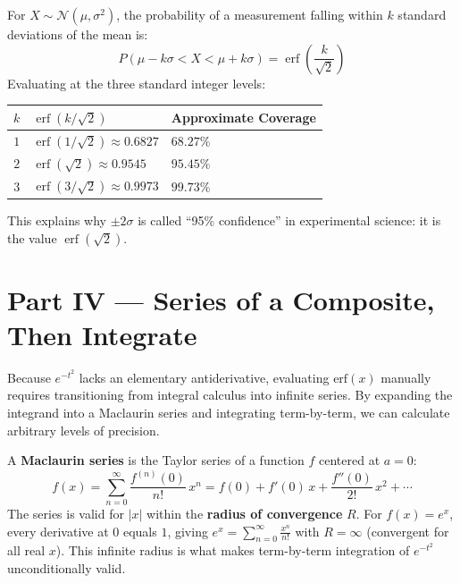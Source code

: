 \documentclass[11pt]{article}
\begin{document}
\begin{theorembox}
For $X \sim \mathcal{N}(\mu, \sigma^2)$, the probability of a measurement falling within $k$ standard deviations of the mean is:
\[ P(\mu - k\sigma < X < \mu + k\sigma) = \operatorname{erf}\!\left(\frac{k}{\sqrt{2}}\right) \]
Evaluating at the three standard integer levels:
\begin{center}
\begin{tabular}{c l l}
\toprule
$k$ & $\operatorname{erf}(k/\sqrt{2})$ & Approximate Coverage \\
\midrule
$1$ & $\operatorname{erf}(1/\sqrt{2}) \approx 0.6827$ & $68.27\%$ \\
$2$ & $\operatorname{erf}(\sqrt{2}) \approx 0.9545$ & $95.45\%$ \\
$3$ & $\operatorname{erf}(3/\sqrt{2}) \approx 0.9973$ & $99.73\%$ \\
\bottomrule
\end{tabular}
\end{center}
This explains why $\pm 2\sigma$ is called ``95\% confidence'' in experimental science: it is the value $\operatorname{erf}(\sqrt{2})$.
\end{theorembox}

\clearpage
{}
{}
\section*{Part IV --- Series of a Composite, Then Integrate}
\setcounter{section}{4}

Because $e^{-t^2}$ lacks an elementary antiderivative, evaluating $\text{erf}(x)$ manually requires transitioning from integral calculus into infinite series. By expanding the integrand into a Maclaurin series and integrating term-by-term, we can calculate arbitrary levels of precision.

\begin{defnbox}
A \textbf{Maclaurin series} is the Taylor series of a function $f$ centered at $a = 0$:
\[ f(x) = \sum_{n=0}^{\infty} \frac{f^{(n)}(0)}{n!}\,x^n = f(0) + f'(0)\,x + \frac{f''(0)}{2!}\,x^2 + \cdots \]
The series is valid for $|x|$ within the \textbf{radius of convergence} $R$. For $f(x) = e^x$, every derivative at $0$ equals $1$, giving $e^x = \sum_{n=0}^{\infty} \frac{x^n}{n!}$ with $R = \infty$ (convergent for all real $x$). This infinite radius is what makes term-by-term integration of $e^{-t^2}$ unconditionally valid.
\end{defnbox}
\end{document}
